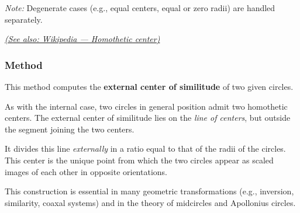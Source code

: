 \medskip
\noindent
\emph{Note:} Degenerate cases (e.g., equal centers, equal or zero radii) are handled separately.

\begin{flushright}
\href{https://en.wikipedia.org/wiki/Homothetic_center}{\textit{(See also: Wikipedia — Homothetic center)}}
\end{flushright}

\vspace{1em}


\begin{tkzexample}[latex=.5\textwidth]
 \begin{center}
 \end{center}
\end{tkzexample}


\subsubsection{Method } %
\label{ssub:method_circle_external__similitude}


This method computes the \textbf{external center of similitude} of two given circles.

\medskip
\noindent
As with the internal case, two circles in general position admit two homothetic centers. The external center of similitude lies on the \emph{line of centers}, but outside the segment joining the two centers.

\medskip
\noindent
It divides this line \emph{externally} in a ratio equal to that of the radii of the circles. This center is the unique point from which the two circles appear as scaled images of each other in opposite orientations.

\medskip
\noindent
This construction is essential in many geometric transformations (e.g., inversion, similarity, coaxal systems) and in the theory of midcircles and Apollonius circles.

